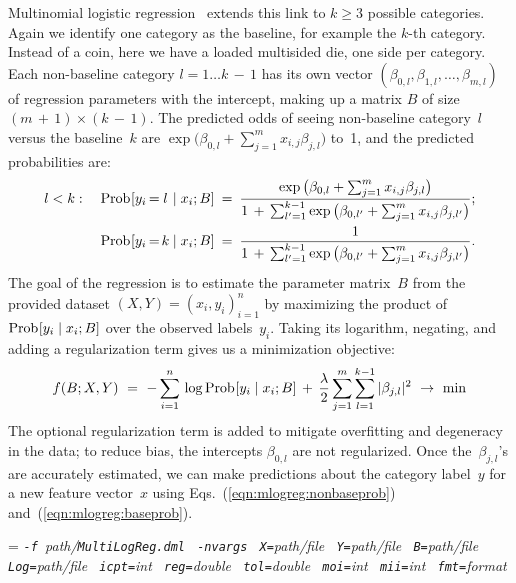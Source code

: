 Multinomial logistic regression~\cite{Agresti2002:CDA} extends this link to $k \geq 3$ possible
categories.  Again we identify one category as the baseline, for example the $k$-th category.
Instead of a coin, here we have a loaded multisided die, one side per category.  Each non-baseline
category $l = 1\ldots k\,{-}\,1$ has its own vector $(\beta_{0,l}, \beta_{1,l}, \ldots, \beta_{m,l})$
of regression parameters with the intercept, making up a matrix $B$ of size
$(m\,{+}\,1)\times(k\,{-}\,1)$.  The predicted odds of seeing non-baseline category~$l$ versus
the baseline~$k$ are $\exp\big(\beta_{0,l} + \sum\nolimits_{j=1}^m x_{i,j}\beta_{j,l}\big)$
to~1, and the predicted probabilities are:
\begin{align}
l < k:\quad\Prob[y_i\,{=}\,\makebox[0.5em][c]{$l$}\mid x_i; B] \,\,\,{=}\,\,\,&
\frac{\exp\big(\beta_{0,l} + \sum\nolimits_{j=1}^m x_{i,j}\beta_{j,l}\big)}%
{1 \,+\, \sum_{l'=1}^{k-1}\exp\big(\beta_{0,l'} + \sum\nolimits_{j=1}^m x_{i,j}\beta_{j,l'}\big)};
\label{eqn:mlogreg:nonbaseprob}\\
\Prob[y_i\,{=}\,\makebox[0.5em][c]{$k$}\mid x_i; B] \,\,\,{=}\,\,\,& \frac{1}%
{1 \,+\, \sum_{l'=1}^{k-1}\exp\big(\beta_{0,l'} + \sum\nolimits_{j=1}^m x_{i,j}\beta_{j,l'}\big)}.
\label{eqn:mlogreg:baseprob}
\end{align}
The goal of the regression is to estimate the parameter matrix~$B$ from the provided dataset
$(X, Y) = (x_i, y_i)_{i=1}^n$ by maximizing the product of \hbox{$\mathop{\mathrm{Prob}\hspace{0.5pt}}\nolimits[y_i\mid x_i; B]$}
over the observed labels~$y_i$.  Taking its logarithm, negating, and adding a regularization term
gives us a minimization objective:
\begin{equation}
f(B; X, Y) \,\,=\,\,
-\sum_{i=1}^n \,\log \mathop{\mathrm{Prob}\hspace{0.5pt}}\nolimits[y_i\mid x_i; B] \,+\,
\frac{\lambda}{2} \sum_{j=1}^m \sum_{l=1}^{k-1} |\beta_{j,l}|^2
\,\,\to\,\,\min
\label{eqn:mlogreg:loss}
\end{equation}
The optional regularization term is added to mitigate overfitting and degeneracy in the data;
to reduce bias, the intercepts $\beta_{0,l}$ are not regularized.  Once the~$\beta_{j,l}$'s
are accurately estimated, we can make predictions about the category label~$y$ for a new
feature vector~$x$ using Eqs.~(\ref{eqn:mlogreg:nonbaseprob}) and~(\ref{eqn:mlogreg:baseprob}).

\smallskip
{}
\smallskip

{\hangindent=\parindent\noindent\it%
{\tt{}-f }path/\/{\tt{}MultiLogReg.dml}
{\tt{} -nvargs}
{\tt{} X=}path/file
{\tt{} Y=}path/file
{\tt{} B=}path/file
{\tt{} Log=}path/file
{\tt{} icpt=}int
{\tt{} reg=}double
{\tt{} tol=}double
{\tt{} moi=}int
{\tt{} mii=}int
{\tt{} fmt=}format

}


